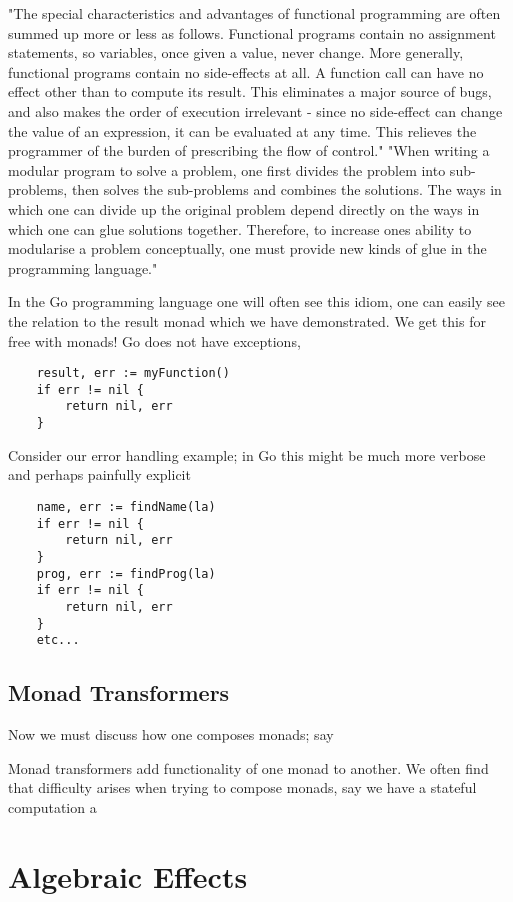 \documentclass[a4paper,10pt]{article}
\theoremstyle{definition}
\begin{document}
"The special characteristics and advantages of functional programming are often summed up more or less as follows. Functional programs contain no assignment statements, so variables, once given a value, never change. More generally, functional programs contain no side-effects at all. A function call can have no effect other than to compute its result. This eliminates a major source of bugs, and also makes the order of execution irrelevant - since no side-effect can change the value of an expression, it can be evaluated at any time. This relieves the programmer of the burden of prescribing the flow of control."
"When writing a modular program to solve a problem, one first divides the problem into sub- problems, then solves the sub-problems and combines the solutions. The ways in which one can divide up the original problem depend directly on the ways in which one can glue solutions together. Therefore, to increase ones ability to modularise a problem conceptually, one must provide new kinds of glue in the programming language."
\cite{hughes1989functional}

In the Go programming language one will often see this idiom,
one can easily see the relation to the result monad which we
have demonstrated.
We get this for free with monads!
Go does not have exceptions,

\begin{verbatim}
    result, err := myFunction()
    if err != nil {
        return nil, err
    }
\end{verbatim}

Consider our error handling example;
in Go this might be much more verbose
and perhaps painfully explicit

\begin{verbatim}
    name, err := findName(la)
    if err != nil {
        return nil, err
    }
    prog, err := findProg(la)
    if err != nil {
        return nil, err
    }
    etc...
\end{verbatim}

\subsection{Monad Transformers}
Now we must discuss how one composes monads;
say

Monad transformers add functionality of one monad to another.
We often find that difficulty arises when trying to compose monads,
say we have a stateful computation a
\cite{king1993combining}


\pagebreak
\section{Algebraic Effects}
\end{document}
